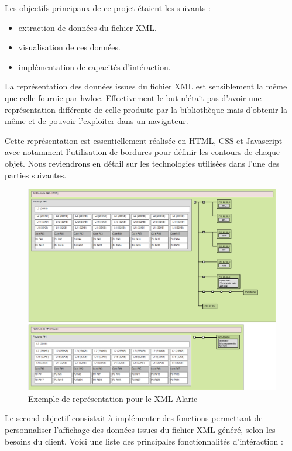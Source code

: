 \documentclass [a4paper,11pt]{article}
\begin{document}
Les objectifs principaux de ce projet étaient les suivants : \newline

\begin{itemize}
\item extraction de données du fichier XML.
\item visualisation de ces données.
\item implémentation de capacités d'intéraction.
\end{itemize}

La représentation des données issues du fichier XML est sensiblement la même que celle fournie par hwloc. Effectivement le but n'était pas d'avoir une représentation différente de celle produite par la bibliothèque mais d'obtenir la même et de pouvoir l'exploiter dans un navigateur. 
\newline

Cette représentation est essentiellement réalisée en HTML, CSS et Javascript avec notamment l'utilisation de bordures pour définir les contours de chaque objet. Nous reviendrons en détail sur les technologies utilisées dans l'une des parties suivantes.

\begin{figure}[H]
\centering
\includegraphics[scale=0.5]{img/alaric.png}
\caption{Exemple de représentation pour le XML Alaric}
\end{figure}

Le second objectif consistait à implémenter des fonctions permettant de personnaliser l'affichage des données issues du fichier XML généré, selon les besoins du client. Voici une liste des principales fonctionnalités d'intéraction : \newline
\end{document}
